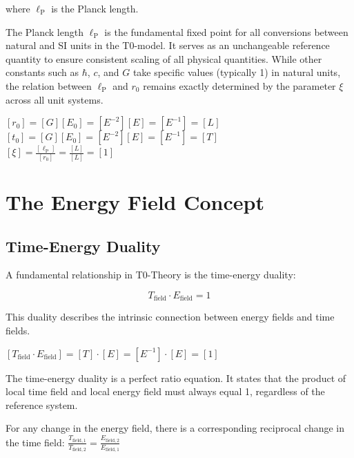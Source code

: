 \documentclass[12pt,a4paper]{article}
\newcommand{\tfield}{T_{\text{field}}}
\newcommand{\efield}{E_{\text{field}}}
\newcommand{\lp}{\ell_{\text{P}}}
\theoremstyle{definition}
\begin{document}
	where $\lp$ is the Planck length.
	
	\begin{wichtig}
		The Planck length $\lp$ is the fundamental fixed point for all conversions between natural and SI units in the T0-model. It serves as an unchangeable reference quantity to ensure consistent scaling of all physical quantities. While other constants such as $\hbar$, $c$, and $G$ take specific values (typically 1) in natural units, the relation between $\lp$ and $r_0$ remains exactly determined by the parameter $\xi$ across all unit systems.
	\end{wichtig}
	
	\begin{einheitencheck}
		$[r_0] = [G][E_0] = [E^{-2}][E] = [E^{-1}] = [L]$ \checkmark\\
		$[t_0] = [G][E_0] = [E^{-2}][E] = [E^{-1}] = [T]$ \checkmark\\
		$[\xi] = \frac{[\lp]}{[r_0]} = \frac{[L]}{[L]} = [1]$ \checkmark
	\end{einheitencheck}
	
	\section{The Energy Field Concept}
	
	\subsection{Time-Energy Duality}
	
	A fundamental relationship in T0-Theory is the time-energy duality:
	
	\begin{equation}
		\boxed{\tfield \cdot \efield = 1}
	\end{equation}
	
	This duality describes the intrinsic connection between energy fields and time fields.
	
	\begin{einheitencheck}
		$[\tfield \cdot \efield] = [T] \cdot [E] = [E^{-1}] \cdot [E] = [1]$ \checkmark
	\end{einheitencheck}
	
	\begin{verhaltnis}
		The time-energy duality is a perfect ratio equation. It states that the product of local time field and local energy field must always equal 1, regardless of the reference system.
		
		For any change in the energy field, there is a corresponding reciprocal change in the time field:
		$\frac{T_{\text{field},1}}{T_{\text{field},2}} = \frac{E_{\text{field},2}}{E_{\text{field},1}}$
	\end{verhaltnis}
	
\end{document}
